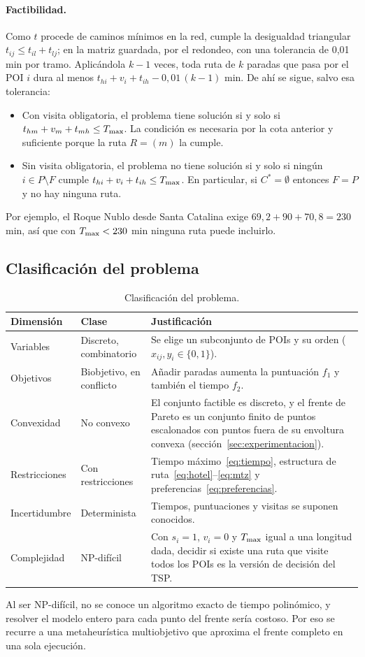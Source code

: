 \paragraph{Factibilidad.} Como $t$ procede de caminos mínimos en la red, cumple la desigualdad triangular $t_{ij} \le t_{il} + t_{lj}$; en la matriz guardada, por el redondeo, con una tolerancia de 0,01 min por tramo. Aplicándola $k-1$ veces, toda ruta de $k$ paradas que pasa por el POI $i$ dura al menos $t_{hi} + v_i + t_{ih} - 0{,}01\,(k-1)$ min. De ahí se sigue, salvo esa tolerancia:
\begin{itemize}
  \item Con visita obligatoria, el problema tiene solución si y solo si $t_{hm} + v_m + t_{mh} \le T_{\max}$. La condición es necesaria por la cota anterior y suficiente porque la ruta $R = (m)$ la cumple.
  \item Sin visita obligatoria, el problema no tiene solución si y solo si ningún $i \in P \setminus F$ cumple $t_{hi} + v_i + t_{ih} \le T_{\max}$. En particular, si $C^* = \emptyset$ entonces $F = P$ y no hay ninguna ruta.
\end{itemize}
Por ejemplo, el Roque Nublo desde Santa Catalina exige $69{,}2 + 90 + 70{,}8 = 230$ min, así que con $T_{\max} < 230$ min ninguna ruta puede incluirlo.

\subsection{Clasificación del problema}

\begin{table}[H]
\centering
\small
\caption{Clasificación del problema.}
\label{tab:clasificacion}
\begin{tabularx}{\textwidth}{@{}l l X@{}}
\toprule
Dimensión & Clase & Justificación \\
\midrule
Variables & Discreto, combinatorio & Se elige un subconjunto de POIs y su orden ($x_{ij}, y_i \in \{0,1\}$). \\
Objetivos & Biobjetivo, en conflicto & Añadir paradas aumenta la puntuación $f_1$ y también el tiempo $f_2$. \\
Convexidad & No convexo & El conjunto factible es discreto, y el frente de Pareto es un conjunto finito de puntos escalonados con puntos fuera de su envoltura convexa (sección~\ref{sec:experimentacion}). \\
Restricciones & Con restricciones & Tiempo máximo~\eqref{eq:tiempo}, estructura de ruta~\eqref{eq:hotel}--\eqref{eq:mtz} y preferencias~\eqref{eq:preferencias}. \\
Incertidumbre & Determinista & Tiempos, puntuaciones y visitas se suponen conocidos. \\
Complejidad & NP-difícil & Con $s_i = 1$, $v_i = 0$ y $T_{\max}$ igual a una longitud dada, decidir si existe una ruta que visite todos los POIs es la versión de decisión del TSP. \\
\bottomrule
\end{tabularx}
\end{table}

Al ser NP-difícil, no se conoce un algoritmo exacto de tiempo polinómico, y resolver el modelo entero para cada punto del frente sería costoso. Por eso se recurre a una metaheurística multiobjetivo que aproxima el frente completo en una sola ejecución.
